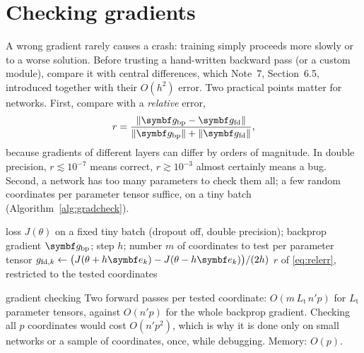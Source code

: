 \documentclass[11pt]{article}
\newcommand{\gvec}{\vect{g}}
\newcommand{\evec}{\vect{e}}
\begin{document}
\section{Checking gradients}\label{sec:gradcheck}

A wrong gradient rarely causes a crash: training simply proceeds more slowly or to a worse solution. Before trusting a
hand-written backward pass (or a custom module), compare it with central differences, which Note~7, Section~6.5,
introduced together with their $O(h^2)$ error. Two practical points matter for networks. First, compare with a
\emph{relative} error,
\begin{equation}\label{eq:relerr}
  r = \frac{\norm{\gvec_{\mathrm{bp}} - \gvec_{\mathrm{fd}}}}{\norm{\gvec_{\mathrm{bp}}} + \norm{\gvec_{\mathrm{fd}}}} ,
\end{equation}
because gradients of different layers can differ by orders of magnitude. In double precision, $r \lesssim 10^{-7}$ means
correct, $r \gtrsim 10^{-3}$ almost certainly means a bug. Second, a network has too many parameters to check them all;
a few random coordinates per parameter tensor suffice, on a tiny batch (Algorithm~\ref{alg:gradcheck}).

\begin{algorithm}[H]
\caption{Gradient checking}\label{alg:gradcheck}
\begin{algorithmic}[1]
\Require loss $J(\theta)$ on a fixed tiny batch (dropout off, double precision); backprop gradient $\gvec_{\mathrm{bp}}$;
  step $h$; number $m$ of coordinates to test per parameter tensor
    \State $g_{\mathrm{fd},k} \gets \big(J(\theta + h\evec_k) - J(\theta - h\evec_k)\big)/(2h)$ 
  \EndFor
  \State \Return $r$ of \eqref{eq:relerr}, restricted to the tested coordinates
\EndFunction
\end{algorithmic}
\end{algorithm}

\begin{runtime}{gradient checking}
Two forward passes per tested coordinate: $O(m\,L_{\mathrm{t}}\,n'p)$ for $L_{\mathrm{t}}$ parameter tensors, against
$O(n'p)$ for the whole backprop gradient. Checking all $p$ coordinates would cost $O(n'p^2)$, which is why it is
done only on small networks or a sample of coordinates, once, while debugging. Memory: $O(p)$.
\end{runtime}
\end{document}
